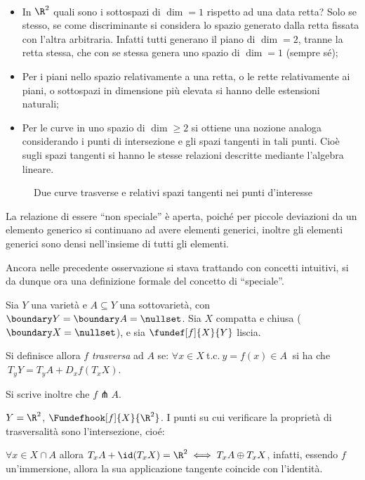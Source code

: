 \begin{es}~
\begin{itemize}
\item In $\R^2$ quali sono i sottospazi di $\dim = 1$ rispetto ad una data retta? Solo se stesso, se come discriminante si considera lo spazio generato dalla retta fissata con l'altra arbitraria. Infatti tutti generano il piano di $\dim = 2$, tranne la retta stessa, che con se stessa genera uno spazio di $\dim = 1$ (sempre sé);
\item Per i piani nello spazio relativamente a una retta, o le rette relativamente ai piani, o sottospazi in dimensione più elevata si hanno delle estensioni naturali;
\item Per le curve in uno spazio di $\dim \geq 2$ si ottiene una nozione analoga considerando i punti di intersezione e gli spazi tangenti in tali punti. Cioè sugli spazi tangenti si hanno le stesse relazioni descritte mediante l'algebra lineare.
\end{itemize}

\begin{figure}[h]
\centering

\caption{Due curve trasverse e relativi spazi tangenti nei punti d'interesse}
\end{figure}
\end{es}

\begin{oss}
La relazione di essere ``non speciale'' è aperta, poiché per piccole deviazioni da un elemento generico si continuano ad avere elementi generici, inoltre gli elementi generici sono densi nell'insieme di tutti gli elementi.
\end{oss}

Ancora nelle precedente osservazione si stava trattando con concetti intuitivi, si da dunque ora una definizione formale del concetto di ``speciale''.

\begin{defn}[Trasversalità]
Sia $Y$ una varietà e $A\subseteq Y$ una sottovarietà, con $\boundary Y = \boundary A = \nullset$. Sia $X$ compatta e chiusa ($\boundary X = \nullset$), e sia $\fundef[f]{X}{Y}$ liscia.

Si definisce allora $f$ \emph{trasversa} ad $A$ se: $\forall x \in X~$t.c.$~y = f(x) \in A~$ si ha che $~T_yY = T_yA + D_xf(T_xX)$.

Si scrive inoltre che $f \pitchfork A$.
\end{defn}

\begin{es}
$Y = \R^2$, $\Fundefhook[f]{X}{\R^2}$. I punti su cui verificare la proprietà di trasversalità sono l'intersezione, cioé:

$\forall x \in X \cap A$ allora $T_xA + \id(T_xX) = \R^2 \iff T_xA \oplus T_xX$, infatti, essendo $f$ un'immersione, allora la sua applicazione tangente coincide con l'identità.
\end{es}

